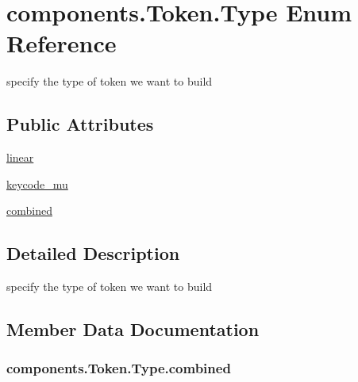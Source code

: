 \hypertarget{enumcomponents_1_1_token_1_1_type}{}\section{components.\+Token.\+Type Enum Reference}
\label{enumcomponents_1_1_token_1_1_type}


specify the type of token we want to build  


\subsection*{Public Attributes}
\begin{DoxyCompactItemize}
\item 
\hyperlink{enumcomponents_1_1_token_1_1_type_ac32881b7c310d3276351f4209e598e3a}{linear}
\item 
\hyperlink{enumcomponents_1_1_token_1_1_type_a87c6d7380a042991b552b6b4fb33acdf}{keycode\+\_\+mu}
\item 
\hyperlink{enumcomponents_1_1_token_1_1_type_a7b9ca06099d60d90f8a502053a4aef4c}{combined}
\end{DoxyCompactItemize}


\subsection{Detailed Description}
specify the type of token we want to build 

\subsection{Member Data Documentation}
\subsubsection[{\texorpdfstring{combined}{combined}}]{\setlength{\rightskip}{0pt plus 5cm}components.\+Token.\+Type.\+combined}\hypertarget{enumcomponents_1_1_token_1_1_type_a7b9ca06099d60d90f8a502053a4aef4c}{}\label{enumcomponents_1_1_token_1_1_type_a7b9ca06099d60d90f8a502053a4aef4c}
